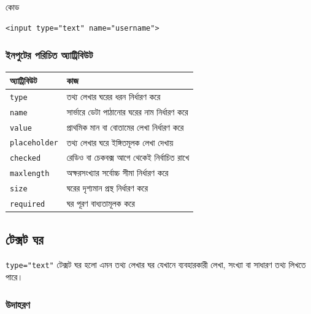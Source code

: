 \begin{examplebox}{কোড}
\par\noindent\begin{minipage}{\linewidth}
\begin{verbatim}
<input type="text" name="username">
\end{verbatim}
\end{minipage}\par
\end{examplebox}

\subsubsection{ইনপুটের পরিচিত অ্যাট্রিবিউট}

\begin{center}
\begin{tabular}{|p{}|p{}|}
\hline
\textbf{অ্যাট্রিবিউট} & \textbf{কাজ} \\
\hline
\texttt{type} & তথ্য লেখার ঘরের ধরন নির্ধারণ করে \\
\hline
\texttt{name} & সার্ভারে ডেটা পাঠানোর ঘরের নাম নির্ধারণ করে \\
\hline
\texttt{value} & প্রাথমিক মান বা বোতামের লেখা নির্ধারণ করে \\
\hline
\texttt{placeholder} & তথ্য লেখার ঘরে ইঙ্গিতমূলক লেখা দেখায় \\
\hline
\texttt{checked} & রেডিও বা চেকবক্স আগে থেকেই নির্বাচিত রাখে \\
\hline
\texttt{maxlength} & অক্ষরসংখ্যার সর্বোচ্চ সীমা নির্ধারণ করে \\
\hline
\texttt{size} & ঘরের দৃশ্যমান প্রস্থ নির্ধারণ করে \\
\hline
\texttt{required} & ঘর পূরণ বাধ্যতামূলক করে \\
\hline
\end{tabular}
\end{center}

\subsection{টেক্সট ঘর}

\begin{definitionbox}{\texttt{type="text"}}
টেক্সট ঘর হলো এমন তথ্য লেখার ঘর যেখানে ব্যবহারকারী লেখা, সংখ্যা বা সাধারণ তথ্য লিখতে পারে।
\end{definitionbox}

\subsubsection{উদাহরণ}

